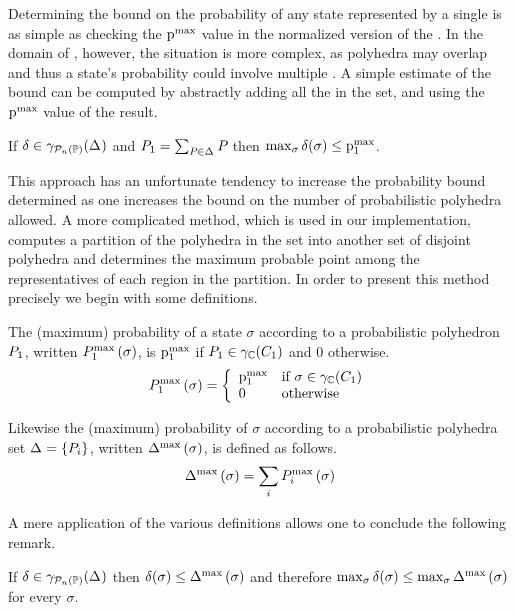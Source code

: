 Determining the bound on the probability of any state represented by a
single \ppname{} is as simple as checking the $ \mathrm{p}^\mathrm{max}_{} $ value in the
normalized version of the \ppname{}. In the domain of \ppsnames{},
however, the situation is more complex, as polyhedra may overlap and
thus a state's probability could involve multiple \ppnames{}.
A simple estimate of the bound can be computed by abstractly adding all the 
\ppnames{} in the set, and using the $ \mathrm{p}^\mathrm{max}_{} $ value of the
result.

\begin{lemma}
\label{lem:ppp:prob-bound}
If $ \delta \in \gamma_{\mathcal{P}_{n}\left( \mathbb{P} \right)}(\Delta_{}) $ and $ P_{1} = \sum_{P_{} \in \Delta_{}} P_{}
$ then $ \max_{\sigma} \delta(\sigma) \leq \mathrm{p}^\mathrm{max}_{1} $.
\end{lemma}

This approach has an unfortunate tendency to increase the probability
bound determined as one increases the bound on the number of
probabilistic polyhedra allowed. A more complicated method, which is
used in our implementation, computes a partition of the polyhedra in
the set into another set of disjoint polyhedra and determines the
maximum probable point among the representatives of each region in the
partition. In order to present this method precisely we begin with
some definitions. 

\begin{definition} The (maximum) probability of a state $ \sigma $ according to
a probabilistic polyhedron $ P_{1} $, written
$ P_{1}^{\text{max}}\left( \sigma \right) $, is $ \mathrm{p}^\mathrm{max}_{1} $ if
$ P_{1} \in \gamma_{\mathbb{C}}(C_{1}) $ and $ 0 $ otherwise.
$$ P_{1}^{\text{max}}\left( \sigma \right) = \left\{
   \begin{array}{ll}
   \mathrm{p}^\mathrm{max}_{1} & \text{if } \sigma \in \gamma_{\mathbb{C}}(C_{1}) \\
   0        & \text{otherwise}
\end{array}
\right.
$$

Likewise the (maximum) probability of $ \sigma $ according to a
probabilistic polyhedra set $ \Delta_{} = \left\{ P_{i} \right\} $, written
$ \Delta_{}^{\text{max}}\left( \sigma \right) $, is defined as follows.
$$ \Delta_{}^{\text{max}}\left( \sigma \right) = \sum_i P_{i}^{\text{max}}\left( \sigma \right) $$
\end{definition}

A mere application of the various definitions allows one to conclude
the following remark.

\begin{remark} \label{rem:ppp:prob} If $ \delta \in \gamma_{\mathcal{P}_{n}\left( \mathbb{P} \right)}(\Delta_{}) $ then
$ \delta(\sigma) \leq \Delta_{}^{\text{max}}\left( \sigma \right) $ and therefore
$ \max_{\sigma} \delta(\sigma) \leq \max_{\sigma}\Delta_{}^{\text{max}}\left( \sigma \right)
$ for every $ \sigma $.
\end{remark}

